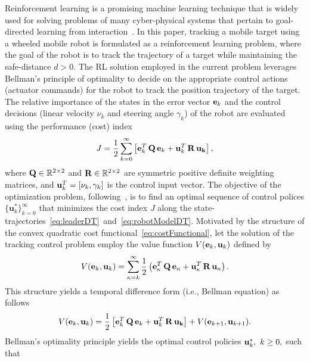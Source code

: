 \documentclass[conference]{IEEEtran}
\begin{document}
 Reinforcement learning is a promising machine learning technique that is widely
 used for solving problems of many cyber-physical systems that pertain to  
 goal-directed learning from interaction~\cite{sutton2020reinforcement}. In this
 paper, tracking a mobile target using a wheeled mobile robot is formulated as a
 reinforcement learning problem, where the goal of the robot is to track the
 trajectory of a target while maintaining the safe-distance $d>0.$ The RL
 solution employed in the current problem leverages Bellman's principle of
 optimality to decide on the appropriate control actions (actuator commands) for
 the robot to track the position trajectory of the target. The relative
 importance of the states in the error vector ${\bf e}_k$ and the control
 decisions (linear velocity $\nu_k$ and steering angle $\gamma_k$) of the robot
 are evaluated using the performance (cost) index %
 \begin{align}
 \label{eq:costFunctional}
   J =  \frac{1}{2} \sum_{k=0}^\infty\left[{\bf e}_k^T \, {\bf Q} \, {\bf e}_k + {\bf u}_k^T \, {\bf R} \, {\bf u_k}\right],
 \end{align}
 where ${\bf Q}\in\mathbb{R}^{2\times 2}$ and ${\bf R}\in\mathbb{R}^{2\times 2}$ are symmetric positive definite weighting matrices, and ${\bf u}_k^T = [\nu_k,\gamma_k]$ is the control input vector.  The objective of the optimization problem, following~\cite{Lewis2013-Reinforcement}, is to find an optimal sequence of control polices $\{\mathbf{u}^*_k\}_{k=0}^\infty$ that minimizes the cost index $J$ along the state-trajectories~\eqref{eq:leaderDT}~and~\eqref{eq:robotModelDT}. Motivated by the structure of the convex quadratic cost functional~\eqref{eq:costFunctional}, let the solution of the tracking control problem employ the value function $V({\bf e}_k,{\bf u}_k)$ defined by %
 \begin{equation*}
 \label{eq:valueFunction}
 V({\bf e}_k,{\bf u}_k) = \sum_{\kappa=k}^\infty \frac{1}{2}\left({\bf e}_\kappa^T\, {\bf Q}\, {\bf e}_\kappa + {\bf u}_\kappa^T \, {\bf R}\, {\bf u_\kappa}\right).
 \end{equation*}
 This structure yields a temporal difference form (i.e., Bellman equation) as follows
 \begin{equation*}
 \label{eq:tempraldiffeq}
 V({\bf e}_k,{\bf u}_k)= \frac{1}{2}\left[{\bf e}_k^T\, {\bf Q}\, {\bf e}_k + {\bf u}_k^T\, {\bf R}\, {\bf u_k}\right] +V({\bf e}_{k+1},{\bf u}_{k+1}).
 \end{equation*}
 Bellman's optimality principle yields the optimal control policies ${\bf u}_k^*,~k\ge 0,$ such that~\cite{Lewis2012} %
\end{document}
